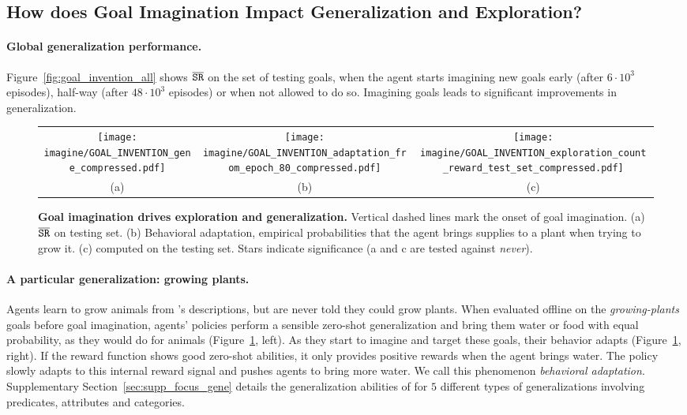 \subsection{How does Goal Imagination Impact Generalization and Exploration?}
\label{sec:res_imag_exp}

\paragraph{Global generalization performance.} 
Figure~\ref{fig:goal_invention_all} shows $\overline{\mathtt{SR}}$ on the set of testing goals, when the agent starts imagining new goals early (after $6\cdot10^3$ episodes), half-way (after $48\cdot10^3$ episodes) or when not allowed to do so. Imagining goals leads to significant improvements in generalization.

\begin{figure}[!h]
    \centering
    \begin{tabular}{ccc}
		\texttt{[image: imagine/GOAL\_INVENTION\_gene\_compressed.pdf]} & \texttt{[image: imagine/GOAL\_INVENTION\_adaptation\_from\_epoch\_80\_compressed.pdf]} & 
		\texttt{[image: imagine/GOAL\_INVENTION\_exploration\_count\_reward\_test\_set\_compressed.pdf]}
		\\
		(a) & (b) & (c)
    \end{tabular}
    \caption{\textbf{Goal imagination drives exploration and generalization.} Vertical dashed lines mark the onset of goal imagination. (a) $\overline{\mathtt{SR}}$ on testing set. (b) Behavioral adaptation, empirical probabilities that the agent brings supplies to a plant when trying to grow it. (c) \itwoc computed on the testing set. Stars indicate significance (a and c are tested against \textit{never}).}
    \label{fig:adaptation}
    \vspace{-.3cm}
\end{figure} 



\paragraph{A particular generalization: growing plants.} Agents learn to grow animals from \SP's descriptions, but are never told they could grow plants. When evaluated offline on the \textit{growing-plants} goals before goal imagination, agents' policies perform a sensible zero-shot generalization and bring them water or food with equal probability, as they would do for animals (Figure~\ref{fig:adaptation}, left). As they start to imagine and target these goals, their behavior adapts (Figure~\ref{fig:adaptation}, right). If the reward function shows good zero-shot abilities, it only provides positive rewards when the agent brings water. The policy slowly adapts to this internal reward signal and pushes agents to bring more water. We call this phenomenon \textit{behavioral adaptation}. Supplementary Section~\ref{sec:supp_focus_gene} details the generalization abilities of \imagine for $5$ different types of generalizations involving predicates, attributes and categories.



